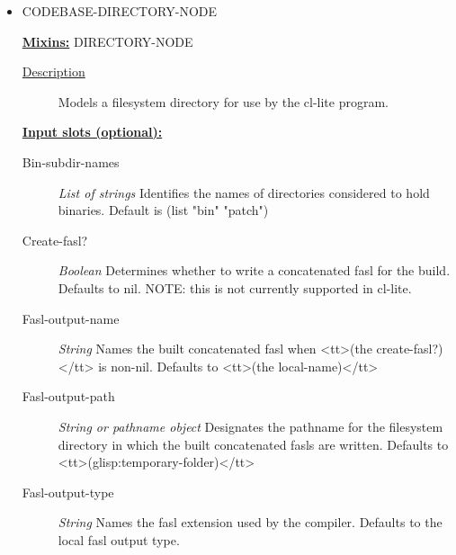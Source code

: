 \documentclass [11pt]{book}
\begin{document}
\begin{itemize}

\item {}CODEBASE-DIRECTORY-NODE


\textbf{
\underline{Mixins:}} DIRECTORY-NODE





\begin{description}

\item [
\underline{Description}]


Models a filesystem directory for use by the cl-lite program.



\end{description}








\textbf{
\underline{Input slots (optional):}}

\begin{description}

\item [Bin-subdir-names]
\emph{List of strings} Identifies the names of directories considered to hold binaries.
Default is (list "bin" "patch")


\item [Create-fasl?]
\emph{Boolean} Determines whether to write a concatenated fasl for the build. Defaults to nil.
NOTE: this is not currently supported in cl-lite.


\item [Fasl-output-name]
\emph{String} Names the built concatenated fasl when <tt>(the create-fasl?)</tt> is non-nil.
Defaults to <tt>(the local-name)</tt>


\item [Fasl-output-path]
\emph{String or pathname object} Designates the pathname for the filesystem directory in which
the built concatenated fasls are written. Defaults to <tt>(glisp:temporary-folder)</tt>


\item [Fasl-output-type]
\emph{String} Names the fasl extension used by the compiler. Defaults to the local fasl output type.



\end{description}
\end{itemize}
\end{document}
